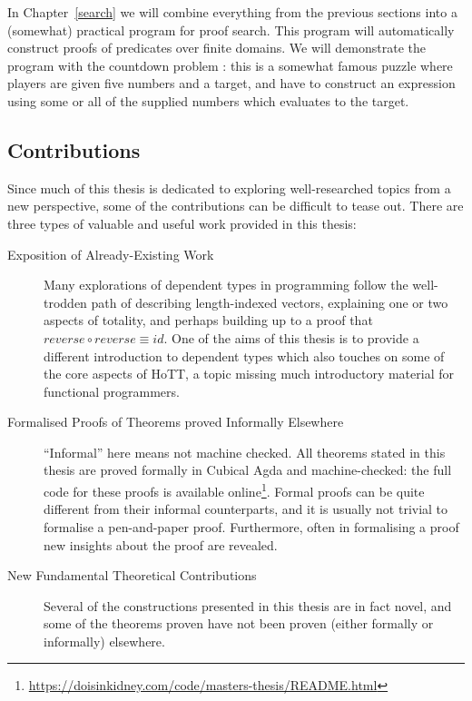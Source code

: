 In Chapter~\ref{search} we will combine everything from the previous sections
into a (somewhat) practical program for proof search.
This program will automatically construct proofs of predicates over finite
domains.
We will demonstrate the program with the countdown problem
\citep{huttonCountdownProblem2002}: this is a somewhat famous puzzle where
players are given five numbers and a target, and have to construct an expression
using some or all of the supplied numbers which evaluates to the target.
\subsection{Contributions}
Since much of this thesis is dedicated to exploring well-researched topics from
a new perspective, some of the contributions can be difficult to tease out.
There are three types of valuable and useful work provided in this thesis:
\begin{description}
  \item[Exposition of Already-Existing Work]
    Many explorations of dependent types in programming follow the well-trodden
    path of describing length-indexed vectors, explaining one or two aspects of
    totality, and perhaps building up to a proof that \(\mathit{reverse} \circ
    \mathit{reverse} \equiv \mathit{id}\).
    One of the aims of this thesis is to provide a different introduction to
    dependent types which also touches on some of the core aspects of HoTT, a
    topic missing much introductory material for functional programmers.
  \item[Formalised Proofs of Theorems proved Informally Elsewhere]
    ``Informal'' here means not machine checked.
    All theorems stated in this thesis are proved formally in Cubical Agda and
    machine-checked: the full code for these proofs is available
    online\footnote{\url{https://doisinkidney.com/code/masters-thesis/README.html}}.
    Formal proofs can be quite different from their informal counterparts, and
    it is usually not trivial to formalise a pen-and-paper proof.
    Furthermore, often in formalising a proof new insights about the proof are
    revealed.
  \item[New Fundamental Theoretical Contributions]
    Several of the constructions presented in this thesis are in fact novel, and
    some of the theorems proven have not been proven (either formally or
    informally) elsewhere.
\end{description}

